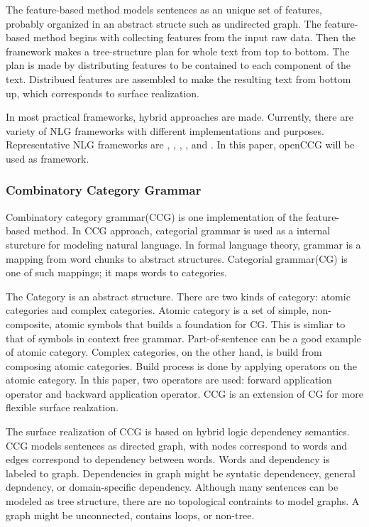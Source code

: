 \documentclass[11pt,letterpaper]{article}
\begin{document}
The feature-based method models sentences as an unique set of features, probably organized in an abstract structe such as undirected graph. The feature-based method begins with collecting features from the input raw data. Then the framework makes a tree-structure plan for whole text from top to bottom. The plan is made by distributing features to be contained to each component of the text. Distribued features are assembled to make the resulting text from bottom up, which corresponds to surface realization. 

In most practical frameworks, hybrid approaches are made. Currently, there are variety of NLG frameworks with different implementations and purposes. Representative NLG frameworks are \cite{geni}, \cite{kpml}, \cite{clint}, \cite{naturalowl}, and \cite{openccg}. In this paper, openCCG will be used as framework. 


\subsubsection{Combinatory Category Grammar} 

Combinatory category grammar(CCG) is one implementation of the feature-based method. In CCG approach, categorial grammar is used as a internal sturcture for modeling natural language. In formal language theory, grammar is a mapping from word chunks to abstract structures. Categorial grammar(CG) is one of such mappings; it maps words to categories. 

The Category is an abstract structure. There are two kinds of category: atomic categories and complex categories. Atomic category is a set of simple, non-composite, atomic symbols that builds a foundation for CG. This is simliar to that of symbols in context free grammar. Part-of-sentence can be a good example of atomic category. Complex categories, on the other hand, is build from composing atomic categories. Build process is done by applying operators on the atomic category. In this paper, two operators are used: forward application operator and backward application operator. CCG is an extension of CG for more flexible surface realzation. 

The surface realization of CCG is based on hybrid logic dependency semantics. CCG models sentences as directed graph, with nodes correspond to words and edges correspond to dependency between words. Words and dependency is labeled to graph. Dependencies in graph might be syntatic dependencey, general depndency, or domain-specific dependency. Although many sentences can be modeled as tree structure, there are no topological contraints to model graphs. A graph might be unconnected, contains loops, or non-tree. 
\end{document}
